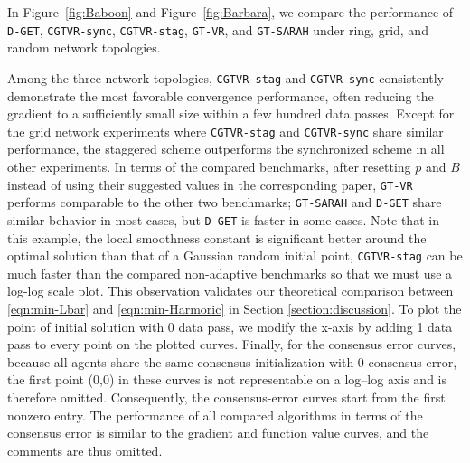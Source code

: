\documentclass{article}
\begin{document}
In Figure~\ref{fig:Baboon} and Figure~\ref{fig:Barbara}, we compare the performance of \texttt{D-GET}, \texttt{CGTVR-sync}, \texttt{CGTVR-stag}, \texttt{GT-VR}, and \texttt{GT-SARAH} under ring, grid, and random network topologies. 

Among the three network topologies, \texttt{CGTVR-stag} and \texttt{CGTVR-sync} consistently demonstrate the most favorable convergence performance, often reducing the gradient to a sufficiently small size within a few hundred data passes. Except for the grid network experiments where \texttt{CGTVR-stag} and \texttt{CGTVR-sync} share similar performance, the staggered scheme outperforms the synchronized scheme in all other experiments. In terms of the compared benchmarks, after resetting $p$ and $B$ instead of using their suggested values in the corresponding paper, \texttt{GT-VR} performs comparable to the other two benchmarks;  \texttt{GT-SARAH} and \texttt{D-GET} share similar behavior in most cases, but \texttt{D-GET} is faster in some cases. Note that in this example, the local smoothness constant is significant better around the optimal solution than that of a Gaussian random initial point, \texttt{CGTVR-stag} can be much faster than the compared non-adaptive benchmarks so that we must use a log-log scale plot. This observation validates our theoretical comparison between \eqref{eqn:min-Lbar} and \eqref{eqn:min-Harmoric} in Section \ref{section:discussion}. To plot the point of initial solution with 0 data pass, we modify the x-axis by adding 1 data pass to every point on the plotted curves. Finally, for the consensus error curves, because all agents share the same consensus initialization with 0 consensus error, the first point (0,0) in these curves is not representable on a log--log axis and is therefore omitted. Consequently, the consensus-error curves start from the first nonzero entry. The performance of all compared algorithms in terms of the consensus error is similar to the gradient and function value curves, and the comments are thus omitted. 




 
\end{document}
